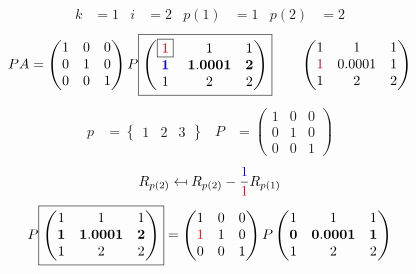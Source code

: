 \documentclass[pdf]{beamer}
\begin{document}
\begin{frame}{}\begin{align*} k &= 1 & i &= 2 & p(1) &= 1 & p(2) &= 2\end{align*} $$PA=\begin{pmatrix}1&0&0\\0&1&0\\0&0&1\end{pmatrix} P \boxed{\begin{pmatrix}\boxed{{\color{red}1}}&1&1\\\mathbf{{\color{blue}1}}&\mathbf{1.0001}&\mathbf{2}\\1&2&2\end{pmatrix}} \quad\quad \begin{pmatrix}1&1&1\\{\color{purple}1}&0.0001&1\\1&2&2\end{pmatrix}$$ \begin{align*} p&= \begin{Bmatrix}1&2&3\end{Bmatrix} & P&= \begin{pmatrix}1&0&0\\0&1&0\\0&0&1\end{pmatrix} \end{align*} $$R_{p(2)} \mapsfrom R_{p(2)} - \frac{{\color{blue}1}}{{\color{red}1}} R_{p(1)}$$ $$ P \boxed{\begin{pmatrix}1&1&1\\\mathbf{1}&\mathbf{1.0001}&\mathbf{2}\\1&2&2\end{pmatrix}} = \begin{pmatrix}1&0&0\\{\color{red}1}&1&0\\0&0&1\end{pmatrix} P \begin{pmatrix}1&1&1\\\mathbf{0}&\mathbf{0.0001}&\mathbf{1}\\1&2&2\end{pmatrix} $$\end{frame}
\end{document}
